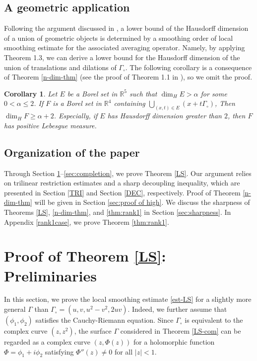 \documentclass[10pt] %
{amsart}
\theoremstyle{plain}
\newtheorem{cor}[thm]{Corollary}
\numberwithin{equation}{section}
\newcommand{\R}{\mathbb R}
\begin{document}
 



\subsection*{A geometric application}
Following the argument discussed in \cite[Proposition 1.5]{HKLO}, a lower bound of the Hausdorff dimension of a union of geometric objects is determined by a smoothing order of local smoothing estimate for the associated averaging operator.  
Namely, by applying Theorem 1.3, we can derive a lower bound for the Hausdorff dimension of the union of translations and dilations of $\Gamma_\circ$. 
The following corollary is a consequence of Theorem \ref{n-dim-thm} (see the proof of Theorem 1.1 in \cite{HKLO}), so we omit the proof. 

\begin{cor}
Let $E$ be a Borel set in $\R^5$ such that $\dim_H E>\alpha$  for some $0<\alpha \le2$. 
If $F$ is a Borel set in $\R^4$ containing $\bigcup_{(x,t)\in E}(x+t\Gamma_\circ)$, Then $\dim_H F \ge \alpha+2$. Especially, if $E$ has Hausdorff dimension greater than $2$, then 
$F$ has positive Lebesgue measure.
\end{cor}



\subsection*{Organization of the paper}
Through Section \ref{sec:pre}--\ref{sec:completion}, we prove Theorem \ref{LS}.  
Our argument relies on trilinear restriction estimates and a sharp decoupling inequality, which  are presented  in Section \ref{TRI} and Section \ref{DEC}, respectively.
Proof of Theorem  \ref{n-dim-thm} will be given in 
Section \ref{sec:proof of high}. 
We discuss the sharpness of Theorems \ref{LS}, \ref{n-dim-thm}, and \ref{thm:rank1} in Section \ref{sec:sharpness}.
In Appendix \ref{rank1case}, we prove Theorem \ref{thm:rank1}.

 
 

 

 

\section{Proof of Theorem \ref{LS}: Preliminaries}\label{sec:pre}

In this section,  
we prove the local smoothing estimate \eqref{est-LS} for a slightly more general $\Gamma$ than $\Gamma_\circ = (u,v,u^2-v^2, 2uv)$. 
Indeed, we further assume that $(\phi_1,\phi_2)$ satisfies the Cauchy-Riemann equation.
Since $\Gamma_\circ$ is equivalent to the complex curve $(z,z^2)$, the surface $\Gamma$ considered in Theorem \ref{LS-com} can be regarded as a complex curve $(z, \Phi (z))$ for a holomorphic function $\Phi = \phi_1 + i \phi_2 $ satisfying $\Phi''(z) \neq 0$ for all $|z| < 1 $. 
\end{document}
